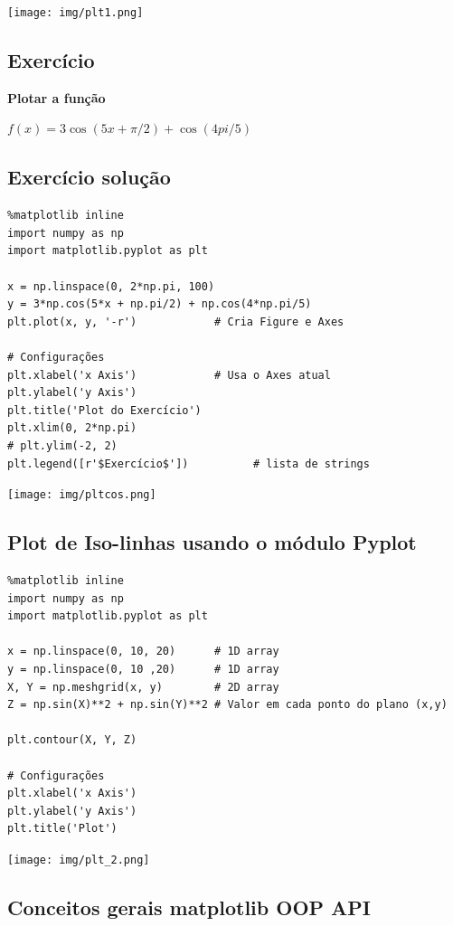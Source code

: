 \documentclass[presentation]{beamer}
\begin{document}
\texttt{[image: img/plt1.png]}
\subsection{Exercício}
\label{sec:orgheadline29}

\textbf{Plotar a função}

\(f(x) = 3  \cos(5x + \pi/2) + \cos(4pi/5)\)

\subsection{Exercício solução}
\label{sec:orgheadline30}

\begin{verbatim}
%matplotlib inline
import numpy as np
import matplotlib.pyplot as plt

x = np.linspace(0, 2*np.pi, 100)
y = 3*np.cos(5*x + np.pi/2) + np.cos(4*np.pi/5)
plt.plot(x, y, '-r')            # Cria Figure e Axes

# Configurações
plt.xlabel('x Axis')            # Usa o Axes atual
plt.ylabel('y Axis')
plt.title('Plot do Exercício')
plt.xlim(0, 2*np.pi)
# plt.ylim(-2, 2)
plt.legend([r'$Exercício$'])          # lista de strings
\end{verbatim}

\texttt{[image: img/pltcos.png]}


\subsection{Plot de Iso-linhas usando o módulo Pyplot}
\label{sec:orgheadline31}

\begin{verbatim}
%matplotlib inline
import numpy as np
import matplotlib.pyplot as plt

x = np.linspace(0, 10, 20)      # 1D array
y = np.linspace(0, 10 ,20)      # 1D array
X, Y = np.meshgrid(x, y)        # 2D array
Z = np.sin(X)**2 + np.sin(Y)**2 # Valor em cada ponto do plano (x,y)

plt.contour(X, Y, Z)

# Configurações
plt.xlabel('x Axis')
plt.ylabel('y Axis')
plt.title('Plot')
\end{verbatim}

\texttt{[image: img/plt\_2.png]}


\subsection{Conceitos gerais matplotlib OOP API}
\label{sec:orgheadline32}
\end{document}
